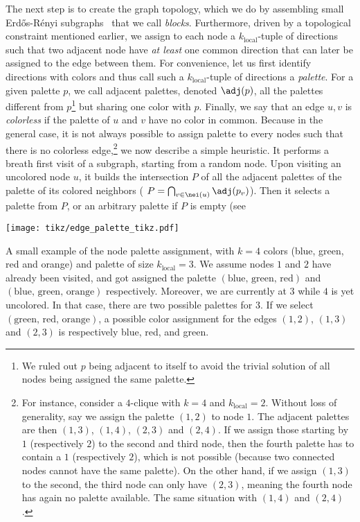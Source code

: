 The next step is to create the graph topology, which we do by assembling small Erdős-Rényi
subgraphs~\autocites{erdos1959random}{gilbertRG59} that we call \emph{blocks}. Furthermore, driven
by a topological constraint mentioned earlier, we assign to each node a $k_\mathrm{local}$-tuple of
directions such that two adjacent node have \emph{at least} one common direction that can later be
assigned to the edge between them. For convenience, let us first identify directions with colors and
thus call such a $k_\mathrm{local}$-tuple of directions a \emph{palette}. For a given palette $p$,
we call adjacent palettes, denoted $\adj(p)$, all the palettes different from $p$\footnote{We ruled
out $p$ being adjacent to itself to avoid the trivial solution of all nodes being assigned the same
palette.} but sharing one
color with $p$. Finally, we say that an edge $u,v$ is \emph{colorless} if the palette of $u$ and $v$ have
no color in common. Because in the general case, it is not always possible to assign palette to
every nodes such that there is no colorless edge,\footnote{For instance, consider a $4$-clique with $k=4$
and $k_\mathrm{local}=2$. Without loss of generality, say we assign the palette $(1,2)$ to node
$1$. The adjacent palettes are then $(1,3)$, $(1,4)$, $(2,3)$ and $(2,4)$. If we assign those
starting by $1$ (respectively $2$) to the second and third node, then the fourth palette has to
contain a $1$ (respectively $2$), which is not possible (because two connected nodes cannot have the
same palette). On the other hand, if we assign $(1,3)$ to the second, the third node can only have
$(2,3)$, meaning the fourth node has again no palette available. The same situation with $(1,4)$ and
$(2,4)$.} we now describe a simple heuristic. It performs a breath first visit of a subgraph,
starting from a random node. Upon visiting an uncolored node $u$, it builds the intersection $P$ of
all the adjacent palettes of the palette of its colored neighbors (\ie{} $P=\bigcap_{v\in \nei(u)}
\adj(p_v)$). Then it selects \uar{} a palette from $P$, or an arbitrary palette if $P$ is empty (see
\begin{marginfigure}
  \centering
  \texttt{[image: tikz/edge\_palette\_tikz.pdf]}
  \caption{A small example of the node palette assignment, with $k=4$ colors (blue, green, red and
    orange) and palette of size $k_\mathrm{local}=3$. We assume nodes $1$ and $2$ have already been
    visited, and got assigned the palette $(\text{blue, green, red})$ and $(\text{blue, green,
    orange})$ respectively. Moreover, we are currently at $3$ while $4$ is yet uncolored. In that
    case, there are two possible palettes for $3$. If we select $(\text{green, red, orange})$, a
    possible color assignment for the edges $(1,2)$, $(1, 3)$ and $(2, 3)$ is respectively blue,
    red, and green.
  \label{fig:edge_palette}}
\end{marginfigure}
